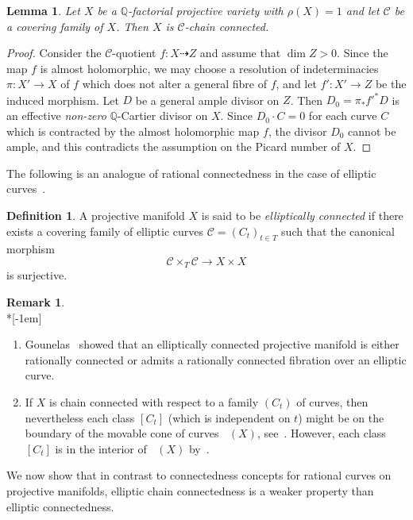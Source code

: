 \documentclass[11pt]{article}
\newtheorem{lemm}[theo]{Lemma}
\theoremstyle{definition}
\newtheorem{defi}[theo]{Definition}
\newtheorem{rema}[theo]{Remark}
\numberwithin{equation}{section}
\numberwithin{figure}{section}
\numberwithin{table}{section}
\DeclareMathOperator{\NEb}{\overline{NE}}
\DeclareMathOperator{\NMb}{\overline{NM}}
\newcommand{\Qbb}{\mathbb{Q}} %
\newcommand\sC{\mathcal{C}}
\begin{document}
\begin{lemm}\label{lem:triv}
Let $X$ be a $\Qbb$-factorial projective variety with $\rho(X) = 1$ and let $\sC$ be a covering family of $X$. Then $X$ is $\sC$-chain connected.
\end{lemm}

\begin{proof}
Consider the $\sC$-quotient $f\colon X \dasharrow Z$ and assume that $\dim Z > 0.$ Since the map $f$ is almost holomorphic, we may choose a resolution of indeterminacies $\pi\colon X' \to X$ of $f$ which does not alter a general fibre of $f$, and let $f'\colon X' \to Z$ be the induced morphism. Let $D$ be a general ample divisor on $Z$. Then $D_0 = \pi_*f'^*D$ is an effective \emph{non-zero} $\Qbb$-Cartier divisor on $X$. Since $D_0 \cdot C = 0 $ for each curve $C$ which is contracted by the almost holomorphic map $f$, the divisor $D_0$ cannot be ample, and this contradicts the assumption on the Picard number of $X$.
\end{proof}

The following is an analogue of rational connectedness in the case of elliptic curves~\cite[Definition~3.3]{Gou16}.

\begin{defi}\label{def:main4.5}
A projective manifold $X$ is said to be \emph{elliptically connected} if there exists a covering family of elliptic curves $\sC = (C_t)_{t \in T}$ such that the canonical morphism
\[
\sC \times_T \sC \to X \times X
\]
is surjective.
\end{defi}

\begin{rema}\label{rem2}\ \\*[-1em]
\begin{enumerate}
\item \label{list-4.6.1}Gounelas~\cite[Theorem~6.2]{Gou16} showed that an elliptically connected projective manifold is either rationally connected or admits a rationally connected fibration over an elliptic curve.
\item \label{list-4.6.2}If $X$ is chain connected with respect to a family $(C_t)$ of curves, then nevertheless each class $[C_t]$ (which is independent on $t$) might be on the boundary of the movable cone of curves $\NMb(X)$, see~\cite[Example~8.8]{BDPP}. However, each class $[C_t]$ is in the interior of $\NEb(X)$ by~\cite[Theorem~2.6]{BCE+}.
\end{enumerate}
\end{rema}

We now show that in contrast to connectedness concepts for rational curves on projective manifolds, elliptic chain connectedness is a weaker property than elliptic connectedness.
\end{document}
